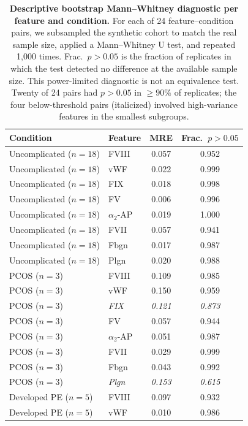 \begin{table}[ht]
\centering
\caption{\textbf{Descriptive bootstrap Mann--Whitney diagnostic per feature and
condition.} For each of 24 feature--condition pairs, we subsampled the
synthetic cohort to match the real sample size, applied a Mann--Whitney U test,
and repeated 1{,}000 times. Frac.\ $p > 0.05$ is the fraction of replicates in
which the test detected no difference at the available sample size. This
power-limited diagnostic is not an equivalence test.
Twenty of 24 pairs had $p > 0.05$ in $\geq 90\%$ of replicates; the four
below-threshold pairs (italicized) involved high-variance features in the smallest
subgroups.}
\label{stab:bootstrap-mw}
\begin{tabular}{llcc}
\toprule
Condition & Feature & MRE & Frac.\ $p > 0.05$ \\
\midrule
Uncomplicated ($n{=}18$) & FVIII   & 0.057 & 0.952 \\
Uncomplicated ($n{=}18$) & vWF     & 0.022 & 0.999 \\
Uncomplicated ($n{=}18$) & FIX     & 0.018 & 0.998 \\
Uncomplicated ($n{=}18$) & FV      & 0.006 & 0.996 \\
Uncomplicated ($n{=}18$) & $\alpha_2$-AP & 0.019 & 1.000 \\
Uncomplicated ($n{=}18$) & FVII    & 0.057 & 0.941 \\
Uncomplicated ($n{=}18$) & Fbgn    & 0.017 & 0.987 \\
Uncomplicated ($n{=}18$) & Plgn    & 0.020 & 0.988 \\
\midrule
PCOS ($n{=}3$)  & FVIII   & 0.109 & 0.985 \\
PCOS ($n{=}3$)  & vWF     & 0.150 & 0.959 \\
PCOS ($n{=}3$)  & \textit{FIX}     & \textit{0.121} & \textit{0.873} \\
PCOS ($n{=}3$)  & FV      & 0.057 & 0.944 \\
PCOS ($n{=}3$)  & $\alpha_2$-AP & 0.051 & 0.987 \\
PCOS ($n{=}3$)  & FVII    & 0.029 & 0.999 \\
PCOS ($n{=}3$)  & Fbgn    & 0.043 & 0.992 \\
PCOS ($n{=}3$)  & \textit{Plgn}    & \textit{0.153} & \textit{0.615} \\
\midrule
Developed PE ($n{=}5$) & FVIII   & 0.097 & 0.932 \\
Developed PE ($n{=}5$) & vWF     & 0.010 & 0.986 \\

\end{tabular}
\end{table}
